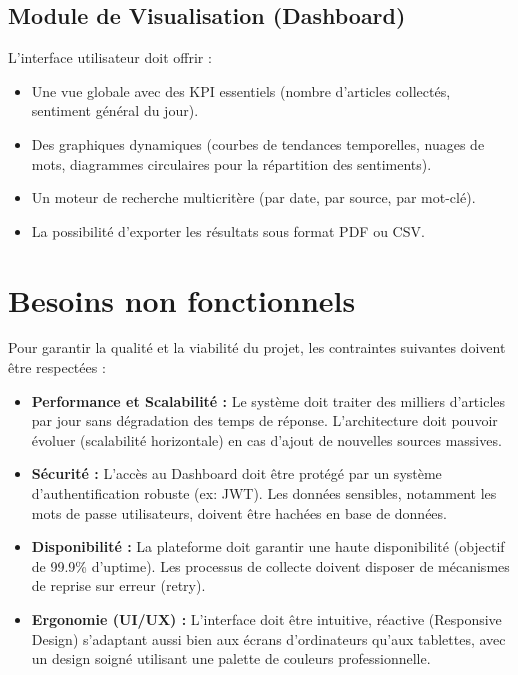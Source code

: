 \documentclass[12pt,a4paper,oneside]{report}
\begin{document}
\subsection{Module de Visualisation (Dashboard)}
L'interface utilisateur doit offrir :
\begin{itemize}
    \item Une vue globale avec des KPI essentiels (nombre d'articles collectés, sentiment général du jour).
    \item Des graphiques dynamiques (courbes de tendances temporelles, nuages de mots, diagrammes circulaires pour la répartition des sentiments).
    \item Un moteur de recherche multicritère (par date, par source, par mot-clé).
    \item La possibilité d'exporter les résultats sous format PDF ou CSV.
\end{itemize}

\section{Besoins non fonctionnels}
Pour garantir la qualité et la viabilité du projet, les contraintes suivantes doivent être respectées :
\begin{itemize}[label=\textcolor{primary}{$\rightarrow$}, itemsep=10pt]
    \item \textbf{Performance et Scalabilité :} Le système doit traiter des milliers d'articles par jour sans dégradation des temps de réponse. L'architecture doit pouvoir évoluer (scalabilité horizontale) en cas d'ajout de nouvelles sources massives.
    \item \textbf{Sécurité :} L'accès au Dashboard doit être protégé par un système d'authentification robuste (ex: JWT). Les données sensibles, notamment les mots de passe utilisateurs, doivent être hachées en base de données.
    \item \textbf{Disponibilité :} La plateforme doit garantir une haute disponibilité (objectif de 99.9\% d'uptime). Les processus de collecte doivent disposer de mécanismes de reprise sur erreur (retry).
    \item \textbf{Ergonomie (UI/UX) :} L'interface doit être intuitive, réactive (Responsive Design) s'adaptant aussi bien aux écrans d'ordinateurs qu'aux tablettes, avec un design soigné utilisant une palette de couleurs professionnelle.
\end{itemize}

\newpage
\end{document}
